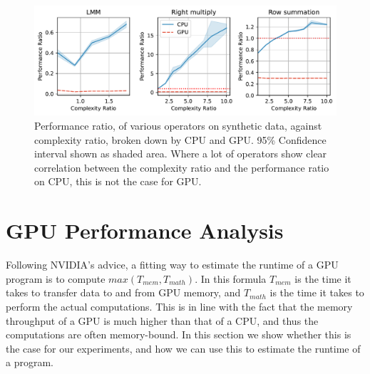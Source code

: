 \begin{figure}[ht]
    \centering
    \includegraphics[width=\linewidth]{chapters/05_cost_estimation/figures/motivation_speedup_complexity_ratio.pdf}
    \caption[Performance ratio plotted against complexity ratio]{Performance ratio, of various operators on synthetic data, against complexity ratio, broken down by CPU and GPU. 95\% Confidence interval shown as shaded area. Where a lot of operators show clear correlation between the complexity ratio and the performance ratio on CPU, this is not the case for GPU.}
    \label{fig:5-complexity-ratio-vs-performance-ratio}
\end{figure}


\section{GPU Performance Analysis}
\label{sec:5-gpu-performance-analysis}
Following NVIDIA's advice, a fitting way to estimate the runtime of a GPU program is to compute $max(T_{mem}, T_{math})$. In this formula $T_{mem}$ is the time it takes to transfer data to and from GPU memory, and $T_{math}$ is the time it takes to perform the actual computations. This is in line with the fact that the memory throughput of a GPU is much higher than that of a CPU, and thus the computations are often memory-bound. In this section we show whether this is the case for our experiments, and how we can use this to estimate the runtime of a program.


